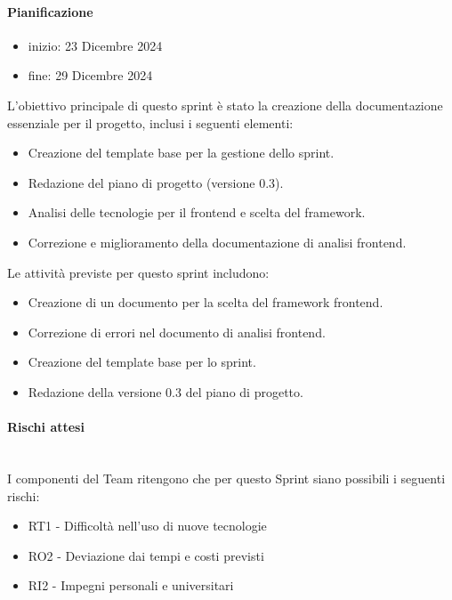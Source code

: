 \documentclass{article}
\begin{document}
                \paragraph{Pianificazione}
                \begin{itemize}
                    \item inizio: 23 Dicembre 2024
                    \item fine: 29 Dicembre 2024
                \end{itemize}
                L'obiettivo principale di questo sprint è stato la creazione della documentazione essenziale per il progetto, inclusi i seguenti elementi:
                \begin{itemize}
                    \item Creazione del template base per la gestione dello sprint.
                    \item Redazione del piano di progetto (versione 0.3).
                    \item Analisi delle tecnologie per il frontend e scelta del framework.
                    \item Correzione e miglioramento della documentazione di analisi frontend.
                \end{itemize}
                
                Le attività previste per questo sprint includono:
                \begin{itemize}
                    \item Creazione di un documento per la scelta del framework frontend.
                    \item Correzione di errori nel documento di analisi frontend.
                    \item Creazione del template base per lo sprint.
                    \item Redazione della versione 0.3 del piano di progetto.
                \end{itemize}


                \paragraph{Rischi attesi}\mbox{}\\
                I componenti del Team ritengono che per questo Sprint siano possibili i seguenti rischi:
                \begin{itemize}
                    \item RT1 - Difficoltà nell’uso di nuove tecnologie
                    \item RO2 - Deviazione dai tempi e costi previsti
                    \item RI2 - Impegni personali e universitari
                \end{itemize}
\end{document}
